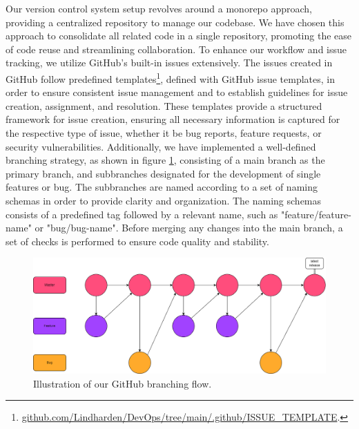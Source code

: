 Our version control system setup revolves around a monorepo approach, providing a centralized repository to manage our codebase. We have chosen this approach to consolidate all related code in a single repository, promoting the ease of code reuse and streamlining collaboration.
To enhance our workflow and issue tracking, we utilize GitHub's built-in issues extensively. The issues created in GitHub follow predefined templates\footnote{\href{https://github.com/Lindharden/DevOps/tree/main/.github/ISSUE\_TEMPLATE}{github.com/Lindharden/DevOps/tree/main/.github/ISSUE\_TEMPLATE}.}, defined with GitHub issue templates, in order to ensure consistent issue management and to establish guidelines for issue creation, assignment, and resolution. These templates provide a structured framework for issue creation, ensuring all necessary information is captured for the respective type of issue, whether it be bug reports, feature requests, or security vulnerabilities. Additionally, we have implemented a well-defined branching strategy, as shown in figure \ref{fig:branching_flow}, consisting of a main branch as the primary branch, and subbranches designated for the development of single features or bug. The subbranches are named according to a set of naming schemas in order to provide clarity and organization. The naming schemas consists of a predefined tag followed by a relevant name, such as "feature/{feature-name}" or "bug/{bug-name}". Before merging any changes into the main branch, a set of checks is performed to ensure code quality and stability. %
\begin{figure}[H]
    \centering
    \includegraphics[width=\textwidth]{images/branching_flow.png}
    \caption{Illustration of our GitHub branching flow.}
    \label{fig:branching_flow}
\end{figure}

